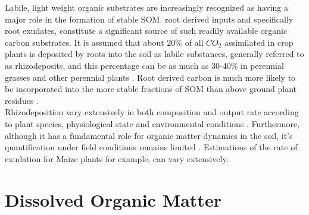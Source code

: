 \documentclass[12pt]{report}
\begin{document}
	Labile, light weight organic substrates are increasingly recognized as having a major role in the formation of stable SOM.
	root derived inputs and specifically root exudates, constitute a significant source of such readily available organic carbon substrates.  It is assumed that about 20\% of all $ CO_2 $ assimilated in crop plants is deposited by roots into the soil as labile substances, generally referred to as rhizodeposits, and this percentage can be as much as 30-40\% in perennial grasses and other perennial plants \citep{kuzyakov2004, pausch2013, pausch2018}. Root derived carbon is much more likely to be incorporated into the more stable fractions of SOM than above ground plant residues \citep{austin2017, kong2010, puget2001, rasse2005}.\\
	Rhizodeposition vary extensively in both composition and output rate according to plant species, physiological state and environmental conditions \citep{dennis2010, pausch2018, jones2004}. Furthermore, although it has a fundamental role for organic matter dynamics in the soil, it’s quantification under field conditions remains limited \citep{pausch2018}. Estimations of the rate of exudation for Maize plants for example, can vary extensively\citep{nguyen2003, pausch2018}.

\section{Dissolved Organic Matter}
\end{document}
